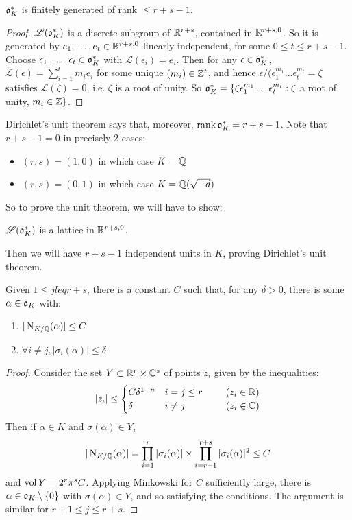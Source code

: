 \documentclass[10pt,a4paper]{article}
\begin{document}
\begin{corollary}
$\mathfrak{o}_K^\ast$ is finitely generated of rank $\leq r+s-1$.
\end{corollary}
\begin{proof}
$\mathscr{L}(\mathfrak{o}_K^\ast)$ is a discrete subgroup of $\mathbb{R}^{r+s}$, contained in $\mathbb{R}^{r+s,0}$. So it is generated by $e_1, \ldots, e_t \in \mathbb{R}^{r+s, 0}$ linearly independent, for some $0 \leq t \leq r+s-1$. Choose $\epsilon_1, \ldots, \epsilon_t \in \mathfrak{o}_K^\ast$ with $\mathscr{L}(\epsilon_i) = e_i$. Then for any $\epsilon \in \mathfrak{o}_K^\ast$, $\mathscr{L}(\epsilon) = \sum_{i=1}^t m_ie_i$ for some unique $(m_i) \in \mathbb{Z}^t$, and hence $\epsilon/(\epsilon_1^{m_1}\ldots\epsilon_t^{m_t} = \zeta$ satisfies $\mathscr{L}(\zeta) = 0$, i.e. $\zeta$ is a root of unity. So $\mathfrak{o}_K^\ast = \{\zeta \epsilon_1^{m_1}\ldots \epsilon_t^{m_t} : \zeta$ a root of unity, $m_i \in \mathbb{Z}\}$.
\end{proof}
Dirichlet's unit theorem says that, moreover, $\operatorname{rank} \mathfrak{o}_K^\ast = r+s-1$. Note that $r+s-1 = 0$ in precisely 2 cases:
\begin{itemize}
\item $(r,s) = (1,0)$ in which case $K = \mathbb{Q}$
\item $(r,s) = (0,1)$ in which case $K = \mathbb{Q}(\sqrt{-d})$
\end{itemize}
So to prove the unit theorem, we will have to show:
\begin{theorem}
$\mathscr{L}(\mathfrak{o}_K^\ast)$ is a lattice in $\mathbb{R}^{r+s, 0}$.
\end{theorem}
Then we will have $r+s-1$ independent units in $K$, proving Dirichlet's unit theorem.
\begin{proposition}
Given $1 \leq j leq r+s$, there is a constant $C$ such that, for any $\delta > 0$, there is some $\alpha \in \mathfrak{o}_K$ with:
\begin{enumerate}
\item $|\operatorname{N}_{K/\mathbb{Q}}(\alpha)| \leq C$
\item $\forall i \neq j, |\sigma_i(\alpha)| \leq \delta$
\end{enumerate}
\end{proposition}
\begin{proof}
Consider the set $Y \subset \mathbb{R}^r \times \mathbb{C}^s$ of points $z_i$ given by the inequalities:
\begin{align*}
|z_i| \leq \begin{cases} C\delta^{1-n} & i=j \leq r \hspace{0.86cm}(z_i \in \mathbb{R})\\ \delta & i \neq j \hspace{1.5cm}(z_i \in \mathbb{C}) \end{cases}
\end{align*}
Then if $\alpha \in K$ and $\sigma(\alpha) \in Y$, 
\begin{align*}
|\operatorname{N}_{K/\mathbb{Q}}(\alpha)| = \prod_{i=1}^r |\sigma_i(\alpha)| \times \prod_{i=r+1}^{r+s} |\sigma_i(\alpha)|^2 \leq C
\end{align*}
and $\operatorname{vol} Y = 2^r\pi^s C$. Applying Minkowski for $C$ sufficiently large, there is $\alpha \in \mathfrak{o}_K \setminus \{0\}$ with $\sigma(\alpha) \in Y$, and so satisfying the conditions. The argument is similar for $r+1 \leq j \leq r+s$.
\end{proof}
\end{document}
